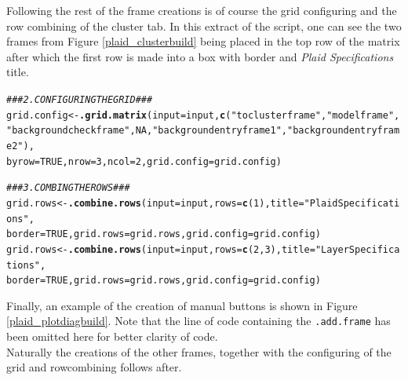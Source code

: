 \documentclass[a4paper]{article}\usepackage[]{graphicx}\usepackage[]{color}
\makeatletter
\newcommand{\hlnum}[1]{\textcolor[rgb]{0.686,0.059,0.569}{#1}}%
\newcommand{\hlstr}[1]{\textcolor[rgb]{0.192,0.494,0.8}{#1}}%
\newcommand{\hlcom}[1]{\textcolor[rgb]{0.678,0.584,0.686}{\textit{#1}}}%
\newcommand{\hlstd}[1]{\textcolor[rgb]{0.345,0.345,0.345}{#1}}%
\newcommand{\hlkwb}[1]{\textcolor[rgb]{0.69,0.353,0.396}{#1}}%
\newcommand{\hlkwc}[1]{\textcolor[rgb]{0.333,0.667,0.333}{#1}}%
\newcommand{\hlkwd}[1]{\textcolor[rgb]{0.737,0.353,0.396}{\textbf{#1}}}%
\newenvironment{kframe}{%
 \def\at@end@of@kframe{}%
 \ifinner\ifhmode%
  \def\at@end@of@kframe{\end{minipage}}%
  \begin{minipage}{\columnwidth}%
 \fi\fi%
 \def\FrameCommand##1{\hskip\@totalleftmargin \hskip-\fboxsep
 \colorbox{shadecolor}{##1}\hskip-\fboxsep
     \hskip-\linewidth \hskip-\@totalleftmargin \hskip\columnwidth}%
 \MakeFramed {\advance\hsize-\width
   \@totalleftmargin\z@ \linewidth\hsize
   \@setminipage}}%
 {\par\unskip\endMakeFramed%
 \at@end@of@kframe}
\newenvironment{knitrout}{}{} %
\makeatother
\begin{document}
\noindent Following the rest of the frame creations is of course the grid
configuring and the row combining of the cluster tab. In this extract of the
script, one can see the two frames from Figure \ref{plaid_clusterbuild} being
placed in the top row of the matrix after which the first row is made into a box
with border and {\it Plaid Specifications} title.
\begin{knitrout}
\color{fgcolor}\begin{kframe}
\begin{alltt}
\hlcom{### 2. CONFIGURING THE GRID ###}
\hlstd{grid.config} \hlkwb{<-} \hlkwd{.grid.matrix}\hlstd{(}\hlkwc{input}\hlstd{=input,}\hlkwd{c}\hlstd{(}\hlstr{"toclusterframe"}\hlstd{,}\hlstr{"modelframe"}\hlstd{,}
   \hlstr{"backgroundcheckframe"}\hlstd{,}\hlnum{NA}\hlstd{,}\hlstr{"backgroundentryframe1"}\hlstd{,}\hlstr{"backgroundentryframe2"}\hlstd{),}
   \hlkwc{byrow}\hlstd{=}\hlnum{TRUE}\hlstd{,}\hlkwc{nrow}\hlstd{=}\hlnum{3}\hlstd{,}\hlkwc{ncol}\hlstd{=}\hlnum{2}\hlstd{,}\hlkwc{grid.config}\hlstd{=grid.config)}

\hlcom{### 3. COMBING THE ROWS ###}
\hlstd{grid.rows} \hlkwb{<-} \hlkwd{.combine.rows}\hlstd{(}\hlkwc{input}\hlstd{=input,}\hlkwc{rows}\hlstd{=}\hlkwd{c}\hlstd{(}\hlnum{1}\hlstd{),}\hlkwc{title}\hlstd{=}\hlstr{"Plaid Specifications"}\hlstd{,}
   \hlkwc{border}\hlstd{=}\hlnum{TRUE}\hlstd{,}\hlkwc{grid.rows}\hlstd{=grid.rows,}\hlkwc{grid.config}\hlstd{=grid.config)}
\hlstd{grid.rows} \hlkwb{<-} \hlkwd{.combine.rows}\hlstd{(}\hlkwc{input}\hlstd{=input,}\hlkwc{rows}\hlstd{=}\hlkwd{c}\hlstd{(}\hlnum{2}\hlstd{,}\hlnum{3}\hlstd{),}\hlkwc{title}\hlstd{=}\hlstr{"Layer Specifications"}\hlstd{,}
   \hlkwc{border}\hlstd{=}\hlnum{TRUE}\hlstd{,}\hlkwc{grid.rows}\hlstd{=grid.rows,}\hlkwc{grid.config}\hlstd{=grid.config)}
\end{alltt}
\end{kframe}
\end{knitrout}
\noindent Finally,  an example of the creation of manual
buttons is shown in Figure \ref{plaid_plotdiagbuild}. Note
that the line of code containing the \verb|.add.frame| has been omitted here
for better clarity of code.\\
Naturally the creations of the other frames, together with the configuring
of the grid and rowcombining follows after.
\end{document}
